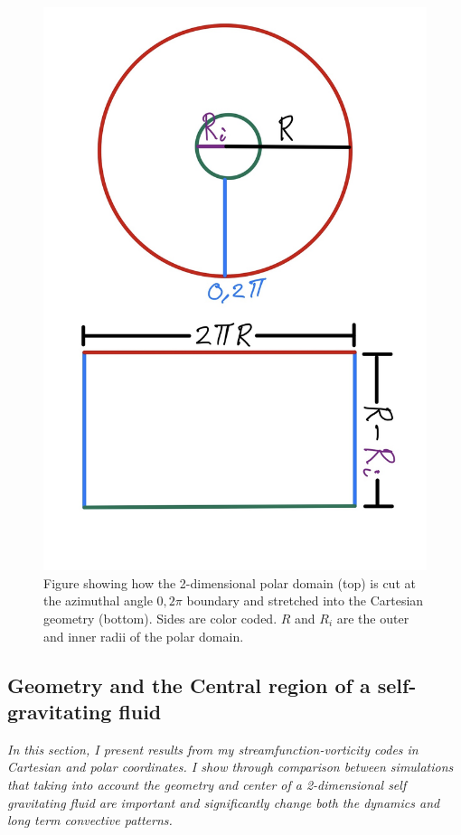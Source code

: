 \documentclass{article}
\begin{document}
\begin{figure}[h!]
	\centering
	\includegraphics[scale=0.25]{unrap image.jpg}
	\caption{Figure showing how the 2-dimensional polar domain (top) is cut at the azimuthal angle $0, 2\pi$ boundary and stretched into the Cartesian geometry (bottom). Sides are color coded. $R$ and $R_i$ are the outer and inner radii of the polar domain.} 
	\label{unrolling}
\end{figure}

\subsection*{Geometry and the Central region of a self-gravitating fluid}
{\it{In this section, I present results from my streamfunction-vorticity codes in Cartesian and polar coordinates. I show through comparison between simulations that taking into account the geometry and center of a 2-dimensional self gravitating fluid are important and significantly change both the dynamics and long term convective patterns.}}
\vspace{0.3cm}
\newline
\end{document}
